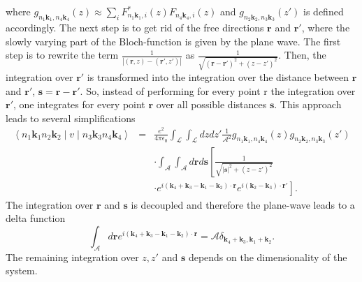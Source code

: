 where $g_{n_{1}\mathbf{k}_{1},n_{4}\mathbf{k}_{4}}(z)\approx\sum_{i}F_{n_{1}\mathbf{k}_{1},i}^{*}(z)F_{n_{4}\mathbf{k}_{4},i}(z)$
and $g_{n_{2}\mathbf{k}_{2},n_{3}\mathbf{k}_{3}}(z')$ is defined
accordingly. The next step is to get rid of the free directions $\mathbf{r}$
and $\mathbf{r}'$, where the slowly varying part of the Bloch-function
is given by the plane wave. The first step is to rewrite the term
$\frac{1}{\left|(\mathbf{r},z)-(\mathbf{r}',z')\right|}$ as $\frac{1}{\sqrt{\left(\mathbf{r}-\mathbf{r}'\right)^{2}+\left(z-z'\right)^{2}}}$.
Then, the integration over $\mathbf{r}'$ is transformed into the
integration over the distance between $\mathbf{r}$ and $\mathbf{r}'$,
$\mathbf{s}=\mathbf{r}-\mathbf{r}'$. So, instead of performing for
every point r the integration over $\mathbf{r}'$, one integrates
for every point $\mathbf{r}$ over all possible distances $\mathbf{s}$.
This approach leads to several simplifications\begin{eqnarray}
\left\langle n_{1}\mathbf{k}_{1}n_{2}\mathbf{k}_{2}\mid v\mid n_{3}\mathbf{k}_{3}n_{4}\mathbf{k}_{4}\right\rangle  & = & \frac{e^{2}}{4\pi\epsilon_{0}}\int_{\mathcal{L}}\int_{\mathcal{L}}dzdz'\frac{1}{\mathcal{A}^{2}}g_{n_{1}\mathbf{k}_{1},n_{4}\mathbf{k}_{4}}(z)g_{n_{2}\mathbf{k}_{2},n_{3}\mathbf{k}_{3}}(z')\nonumber \\
 &  & \cdot\int_{\mathcal{A}}\int_{\mathcal{A}}d\mathbf{r}d\mathbf{s}\left[\frac{1}{\sqrt{\mathbf{\left|s\right|}^{2}+\left(z-z'\right)^{2}}}\right.\nonumber \\
 &  & \left.\cdot e^{i\left(\mathbf{k}_{4}+\mathbf{k}_{3}-\mathbf{k}_{1}-\mathbf{k}_{2}\right)\cdot\mathbf{r}}e^{i\left(\mathbf{k}_{2}-\mathbf{k}_{3}\right)\cdot\mathbf{r}'}\right].\end{eqnarray}
The integration over $\mathbf{r}$ and $\mathbf{s}$ is decoupled
and therefore the plane-wave leads to a delta function\begin{equation}
\int_{\mathcal{A}}d\mathbf{r}e^{i\left(\mathbf{k}_{4}+\mathbf{k}_{3}-\mathbf{k}_{1}-\mathbf{k}_{2}\right)\cdot\mathbf{r}}=\mathcal{A}\delta_{\mathbf{k}_{4}+\mathbf{k}_{3},\mathbf{k}_{1}+\mathbf{k}_{2}}.\label{eq:Delta_1}\end{equation}
The remaining integration over $z,z'$ and $\mathbf{s}$ depends on
the dimensionality of the system. 

